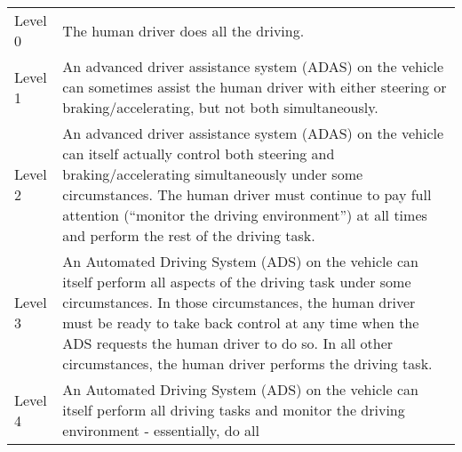 \begin{longtable}[]{@{}ll@{}}
\toprule
\endhead
\begin{minipage}[t]{0.03\columnwidth}\raggedright
Level 0\strut
\end{minipage} & \begin{minipage}[t]{0.91\columnwidth}\raggedright
The human driver does all the driving.\strut
\end{minipage}\tabularnewline
\begin{minipage}[t]{0.03\columnwidth}\raggedright
Level 1\strut
\end{minipage} & \begin{minipage}[t]{0.91\columnwidth}\raggedright
An advanced driver assistance system (ADAS) on the vehicle can sometimes
assist the human driver with either steering or braking/accelerating,
but not both simultaneously.\strut
\end{minipage}\tabularnewline
\begin{minipage}[t]{0.03\columnwidth}\raggedright
Level 2\strut
\end{minipage} & \begin{minipage}[t]{0.91\columnwidth}\raggedright
An advanced driver assistance system (ADAS) on the vehicle can itself
actually control both steering and braking/accelerating simultaneously
under some circumstances. The human driver must continue to pay full
attention (``monitor the driving environment'') at all times and perform
the rest of the driving task.\strut
\end{minipage}\tabularnewline
\begin{minipage}[t]{0.03\columnwidth}\raggedright
Level 3\strut
\end{minipage} & \begin{minipage}[t]{0.91\columnwidth}\raggedright
An Automated Driving System (ADS) on the vehicle can itself perform all
aspects of the driving task under some circumstances. In those
circumstances, the human driver must be ready to take back control at
any time when the ADS requests the human driver to do so. In all other
circumstances, the human driver performs the driving task.\strut
\end{minipage}\tabularnewline
\begin{minipage}[t]{0.03\columnwidth}\raggedright
Level 4\strut
\end{minipage} & \begin{minipage}[t]{0.91\columnwidth}\raggedright
An Automated Driving System (ADS) on the vehicle can itself perform all
driving tasks and monitor the driving environment - essentially, do all

\end{minipage}
\end{longtable}
